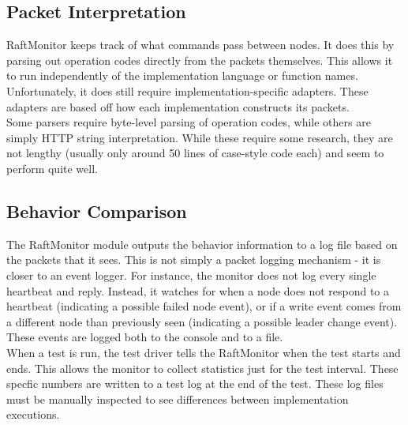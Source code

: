 \documentclass[UTF8]{article}
\begin{document}
\subsection{Packet Interpretation}
RaftMonitor keeps track of what commands pass between nodes. It does this by parsing out operation codes directly from the packets themselves. This allows it to run independently of the implementation language or function names. Unfortunately, it does still require implementation-specific adapters. These adapters are based off how each implementation constructs its packets.
\\ \indent Some parsers require byte-level parsing of operation codes, while others are  simply HTTP string interpretation. While these require some research, they are not lengthy (usually only around 50 lines of case-style code each) and seem to perform quite well.

\subsection{Behavior Comparison}
The RaftMonitor module outputs the behavior information to a log file based on the packets that it sees. This is not simply a packet logging mechanism - it is closer to an event logger. For instance, the monitor does not log every single heartbeat and reply. Instead, it watches for when a node does not respond to a heartbeat (indicating a possible failed node event), or if a write event comes from a different node than previously seen (indicating a possible leader change event). These events are logged both to the console and to a file.
\\ \indent When a test is run, the test driver tells the RaftMonitor when the test starts and ends. This allows the monitor to collect statistics just for the test interval. These specfic numbers are written to a test log at the end of the test. These log files must be manually inspected to see differences between implementation executions.
\end{document}
